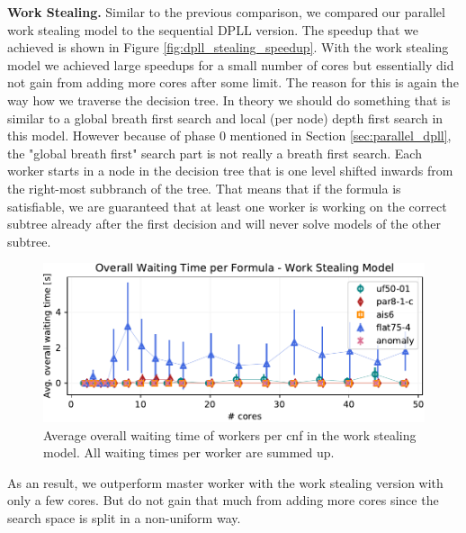 \documentclass[letterpaper]{article}
\newcommand{\mypar}[1]{{\bf #1.}}
\begin{document}
\mypar{Work Stealing}
Similar to the previous comparison, we compared our parallel work stealing model to the sequential DPLL version.
The speedup that we achieved is shown in Figure \ref{fig:dpll_stealing_speedup}.
With the work stealing model we achieved large speedups for a small number of cores but essentially did not gain from adding more cores after some limit.
The reason for this is again the way how we traverse the decision tree.
In theory we should do something that is similar to a global breath first search and local (per node) depth first search in this model.
However because of phase 0 mentioned in Section \ref{sec:parallel_dpll}, the "global breath first" search part is not really a breath first search.
Each worker starts in a node in the decision tree that is one level shifted inwards from the right-most subbranch of the tree.
That means that if the formula is satisfiable, we are guaranteed that at least one worker is working on the correct subtree already after the first decision and will never solve models of the other subtree.

\begin{figure}[p]
	\centering
	\includegraphics[width=\columnwidth]{figures/waiting_stealing_subset_dpll_scaling_tar.pdf}
	\caption{Average overall waiting time of workers per cnf in the work stealing model.
		All waiting times per worker are summed up.}
	\label{fig:dpll_stealing_waiting}
\end{figure}

As an result, we outperform master worker with the work stealing version with only a few cores.
But do not gain that much from adding more cores since the search space is split in a non-uniform way.
\end{document}
